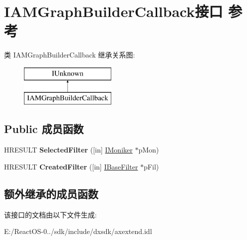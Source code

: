 \hypertarget{interface_i_a_m_graph_builder_callback}{}\section{I\+A\+M\+Graph\+Builder\+Callback接口 参考}
\label{interface_i_a_m_graph_builder_callback}
类 I\+A\+M\+Graph\+Builder\+Callback 继承关系图\+:\begin{figure}[H]
\begin{center}
\leavevmode
\includegraphics[height=2.000000cm]{interface_i_a_m_graph_builder_callback}
\end{center}
\end{figure}
\subsection*{Public 成员函数}
\begin{DoxyCompactItemize}
\item 
\mbox{\label{interface_i_a_m_graph_builder_callback_a41a6e3645f443d67892db1f8c015e0ee}} 
H\+R\+E\+S\+U\+LT {\bfseries Selected\+Filter} (\mbox{[}in\mbox{]} \hyperlink{interface_i_moniker}{I\+Moniker} $\ast$p\+Mon)
\item 
\mbox{\label{interface_i_a_m_graph_builder_callback_aac1ad7bc58e8908ea5786e9105ca705e}} 
H\+R\+E\+S\+U\+LT {\bfseries Created\+Filter} (\mbox{[}in\mbox{]} \hyperlink{interface_i_base_filter}{I\+Base\+Filter} $\ast$p\+Fil)
\end{DoxyCompactItemize}
\subsection*{额外继承的成员函数}


该接口的文档由以下文件生成\+:\begin{DoxyCompactItemize}
\item 
E\+:/\+React\+O\+S-\/0../sdk/include/dxsdk/axextend.\+idl\end{DoxyCompactItemize}
